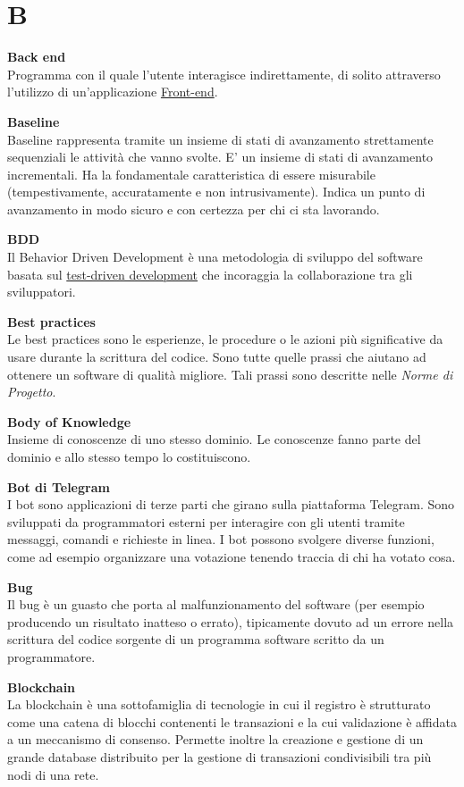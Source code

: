 \documentclass[a4paper, oneside, openany, dvipsnames, table, 12pt]{article}
\begin{document}
\newpage
\section{B}
\textbf{Back end} \\
Programma con il quale l’utente interagisce indirettamente, di solito attraverso l’utilizzo di un’applicazione \hyperref[par:frontend]{Front-end}.

\textbf{Baseline} \\
Baseline rappresenta tramite un insieme di stati di avanzamento
strettamente sequenziali le attività che vanno svolte. E’ un insieme di stati di avanzamento incrementali. Ha la fondamentale caratteristica di essere misurabile (tempestivamente, accuratamente e non intrusivamente). Indica un punto di avanzamento in modo sicuro e con certezza per chi ci sta lavorando.

\textbf{BDD} \\
Il Behavior Driven Development è una metodologia di sviluppo del software basata sul \hyperref[par:tdd]{test-driven development} che incoraggia la collaborazione tra gli sviluppatori.

\textbf{Best practices} \\
Le best practices sono le esperienze, le procedure o le azioni più significative da usare durante la scrittura del codice. Sono tutte quelle prassi che aiutano ad ottenere un software di qualità migliore. Tali prassi sono descritte nelle \textit{Norme di Progetto}.

\textbf{Body of Knowledge}\\
Insieme di conoscenze di uno stesso dominio. Le conoscenze fanno parte del dominio e allo stesso tempo lo costituiscono.

\textbf{Bot di Telegram} \\
I bot sono applicazioni di terze parti che girano sulla piattaforma Telegram. Sono sviluppati da programmatori esterni per interagire con gli utenti tramite messaggi, comandi e richieste in linea. I bot possono svolgere diverse funzioni, come ad esempio organizzare una votazione tenendo traccia di chi ha votato cosa.

\textbf{Bug} \\ 
Il bug è un guasto che porta al malfunzionamento del software (per esempio producendo un risultato inatteso o errato), tipicamente dovuto ad un errore nella scrittura del codice sorgente di un programma software scritto da un programmatore.

\label{par:blockC}
\textbf{Blockchain} \\
La blockchain è una sottofamiglia di tecnologie in cui il registro è strutturato come una catena di blocchi contenenti le transazioni e la cui validazione è affidata a un meccanismo di consenso. 
Permette inoltre la creazione e gestione di un grande database distribuito per la gestione di transazioni condivisibili tra più nodi di una rete. 
\end{document}
